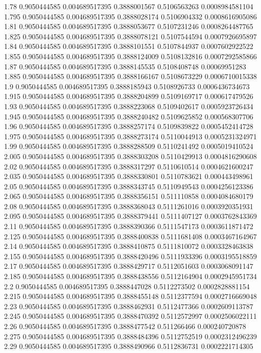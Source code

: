 {1.78 0.9050444585 0.004689517395 0.3888001567 0.5106563263 0.0008984581104
1.795 0.9050444585 0.004689517395 0.3888028174 0.5106904332 0.0008616905086
1.81 0.9050444585 0.004689517395 0.3888053677 0.5107231246 0.0008264487765
1.825 0.9050444585 0.004689517395 0.3888078121 0.5107544594 0.0007926695897
1.84 0.9050444585 0.004689517395 0.3888101551 0.5107844937 0.0007602922522
1.855 0.9050444585 0.004689517395 0.3888124009 0.5108132816 0.0007292585866
1.87 0.9050444585 0.004689517395 0.3888145535 0.5108408748 0.00069951283
1.885 0.9050444585 0.004689517395 0.3888166167 0.5108673229 0.0006710015338
1.9 0.9050444585 0.004689517395 0.3888185943 0.5108926733 0.0006436734673
1.915 0.9050444585 0.004689517395 0.3888204899 0.5109169717 0.000617479526
1.93 0.9050444585 0.004689517395 0.3888223068 0.5109402617 0.0005923726434
1.945 0.9050444585 0.004689517395 0.3888240482 0.5109625852 0.000568307706
1.96 0.9050444585 0.004689517395 0.3888257174 0.5109839822 0.0005452414728
1.975 0.9050444585 0.004689517395 0.3888273174 0.5110044913 0.0005231324971
1.99 0.9050444585 0.004689517395 0.3888288509 0.5110241492 0.0005019410524
2.005 0.9050444585 0.004689517395 0.3888303208 0.5110429913 0.0004816290608
2.02 0.9050444585 0.004689517395 0.3888317297 0.5110610514 0.0004621600247
2.035 0.9050444585 0.004689517395 0.3888330801 0.5110783621 0.000443498961
2.05 0.9050444585 0.004689517395 0.3888343745 0.5110949543 0.0004256123386
2.065 0.9050444585 0.004689517395 0.3888356151 0.511110858 0.0004084680179
2.08 0.9050444585 0.004689517395 0.3888368043 0.5111261016 0.0003920351931
2.095 0.9050444585 0.004689517395 0.3888379441 0.5111407127 0.0003762843369
2.11 0.9050444585 0.004689517395 0.3888390366 0.5111547173 0.0003611871472
2.125 0.9050444585 0.004689517395 0.3888400838 0.5111681408 0.0003467164967
2.14 0.9050444585 0.004689517395 0.3888410875 0.5111810072 0.0003328463838
2.155 0.9050444585 0.004689517395 0.3888420496 0.5111933396 0.0003195518859
2.17 0.9050444585 0.004689517395 0.3888429717 0.5112051603 0.0003068091147
2.185 0.9050444585 0.004689517395 0.3888438556 0.5112164904 0.0002945951734
2.2 0.9050444585 0.004689517395 0.3888447028 0.5112273502 0.0002828881154
2.215 0.9050444585 0.004689517395 0.3888455148 0.5112377594 0.0002716669048
2.23 0.9050444585 0.004689517395 0.3888462931 0.5112477366 0.0002609113787
2.245 0.9050444585 0.004689517395 0.3888470392 0.5112572997 0.0002506022111
2.26 0.9050444585 0.004689517395 0.3888477542 0.511266466 0.000240720878
2.275 0.9050444585 0.004689517395 0.3888484396 0.5112752519 0.0002312496239
2.29 0.9050444585 0.004689517395 0.3888490966 0.5112836731 0.0002221714305
}
